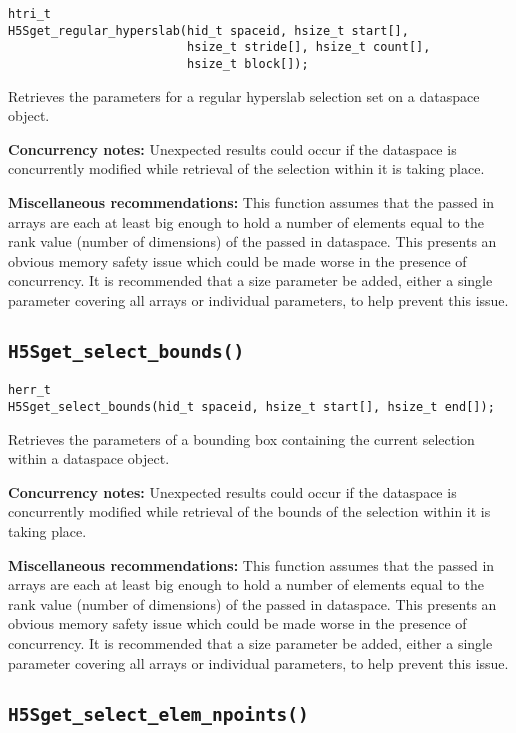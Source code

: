 \documentclass[../HDF5_RFC.tex]{subfiles}
\begin{document}
\begin{verbatim}
htri_t
H5Sget_regular_hyperslab(hid_t spaceid, hsize_t start[],
                         hsize_t stride[], hsize_t count[],
                         hsize_t block[]);
\end{verbatim}

Retrieves the parameters for a regular hyperslab selection set on a dataspace object.

\textbf{Concurrency notes:} Unexpected results could occur if the dataspace is concurrently
modified while retrieval of the selection within it is taking place.

\textbf{Miscellaneous recommendations:} This function assumes that the passed in arrays are
each at least big enough to hold a number of elements equal to the rank value (number of
dimensions) of the passed in dataspace. This presents an obvious memory safety issue which
could be made worse in the presence of concurrency. It is recommended that a size parameter
be added, either a single parameter covering all arrays or individual parameters, to help
prevent this issue.

\subsection{\texttt{H5Sget\_select\_bounds()}}
\label{apdx:h5s_func_h5sget_select_bounds}

\begin{verbatim}
herr_t
H5Sget_select_bounds(hid_t spaceid, hsize_t start[], hsize_t end[]);
\end{verbatim}

Retrieves the parameters of a bounding box containing the current selection within a
dataspace object.

\textbf{Concurrency notes:} Unexpected results could occur if the dataspace is concurrently modified
while retrieval of the bounds of the selection within it is taking place.

\textbf{Miscellaneous recommendations:} This function assumes that the passed in arrays are
each at least big enough to hold a number of elements equal to the rank value (number of
dimensions) of the passed in dataspace. This presents an obvious memory safety issue which
could be made worse in the presence of concurrency. It is recommended that a size parameter
be added, either a single parameter covering all arrays or individual parameters, to help
prevent this issue.

\subsection{\texttt{H5Sget\_select\_elem\_npoints()}}
\label{apdx:h5s_func_h5sget_select_elem_npoints}
\end{document}
